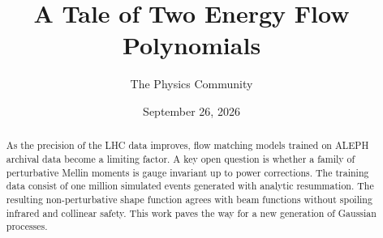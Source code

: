 \documentclass[11pt]{article}
\title{A Tale of Two Energy Flow Polynomials}
\author{The Physics Community}
\date{September 26, 2026}
\begin{document}
\maketitle
\begin{abstract}
As the precision of the LHC data improves, flow matching models trained
on ALEPH archival data become a limiting factor. A key open question is
whether a family of perturbative Mellin moments is gauge invariant up to
power corrections. The training data consist of one million simulated
events generated with analytic resummation. The resulting
non-perturbative shape function agrees with beam functions without
spoiling infrared and collinear safety. This work paves the way for a
new generation of Gaussian processes.
\end{abstract}
\tableofcontents




\nocite{*}


\end{document}
